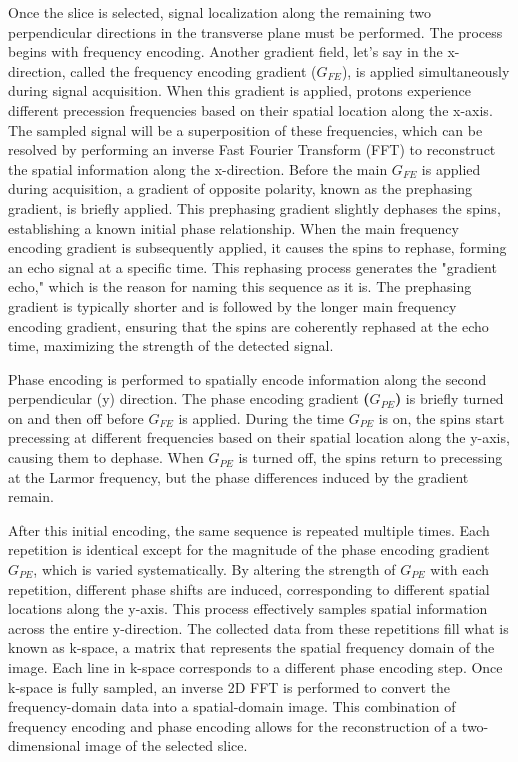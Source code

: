 \documentclass{micro-econ-thesis}
\begin{document}
Once the slice is selected, signal localization along the remaining two perpendicular directions in the transverse plane must be performed. The process begins with frequency encoding. Another gradient field, let's say in the x-direction, called the frequency encoding gradient (\textbf{$G_{FE}$}), is applied simultaneously during signal acquisition. When this gradient is applied, protons experience different precession frequencies based on their spatial location along the x-axis. The sampled signal will be a superposition of these frequencies, which can be resolved by performing an inverse Fast Fourier Transform (FFT) to reconstruct the spatial information along the x-direction. Before the main \textbf{$G_{FE}$} is applied during acquisition, a gradient of opposite polarity, known as the prephasing gradient, is briefly applied. This prephasing gradient slightly dephases the spins, establishing a known initial phase relationship. When the main frequency encoding gradient is subsequently applied, it causes the spins to rephase, forming an echo signal at a specific time. This rephasing process generates the "gradient echo," which is the reason for naming this sequence as it is. The prephasing gradient is typically shorter and is followed by the longer main frequency encoding gradient, ensuring that the spins are coherently rephased at the echo time, maximizing the strength of the detected signal.

Phase encoding is performed to spatially encode information along the second perpendicular (y) direction. The phase encoding gradient \textbf{($G_{PE}$)} is briefly turned on and then off before $G_{FE}$ is applied. During the time $G_{PE}$ is on, the spins start precessing at different frequencies based on their spatial location along the y-axis, causing them to dephase. When $G_{PE}$ is turned off, the spins return to precessing at the Larmor frequency, but the phase differences induced by the gradient remain. 

After this initial encoding, the same sequence is repeated multiple times. Each repetition is identical except for the magnitude of the phase encoding gradient $G_{PE}$, which is varied systematically. By altering the strength of $G_{PE}$ with each repetition, different phase shifts are induced, corresponding to different spatial locations along the y-axis. This process effectively samples spatial information across the entire y-direction. The collected data from these repetitions fill what is known as k-space, a matrix that represents the spatial frequency domain of the image. Each line in k-space corresponds to a different phase encoding step. Once k-space is fully sampled, an inverse 2D FFT is performed to convert the frequency-domain data into a spatial-domain image. This combination of frequency encoding and phase encoding allows for the reconstruction of a two-dimensional image of the selected slice.
\end{document}
